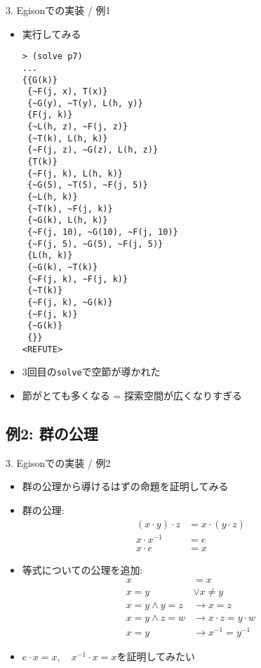 \documentclass[dvipdfmx,11pt,notheorems]{beamer}
\theoremstyle{definition}
\newcommand{\code}[1]{\texttt{#1}}
\begin{document}
\begin{frame}[fragile]{3. Egisonでの実装 / 例1}
  \begin{itemize}
    \item 実行してみる
    \begin{verbatim}
> (solve p7)
...
{{G(k)}
 {~F(j, x), T(x)}
 {~G(y), ~T(y), L(h, y)}
 {F(j, k)}
 {~L(h, z), ~F(j, z)}
 {~T(k), L(h, k)}
 {~F(j, z), ~G(z), L(h, z)}
 {T(k)}
 {~F(j, k), L(h, k)}
 {~G(5), ~T(5), ~F(j, 5)}
 {~L(h, k)}
 {~T(k), ~F(j, k)}
 {~G(k), L(h, k)}
 {~F(j, 10), ~G(10), ~F(j, 10)}
 {~F(j, 5), ~G(5), ~F(j, 5)}
 {L(h, k)}
 {~G(k), ~T(k)}
 {~F(j, k), ~F(j, k)}
 {~T(k)}
 {~F(j, k), ~G(k)}
 {~F(j, k)}
 {~G(k)}
 {}}
<REFUTE>
    \end{verbatim}
    \item 3回目の\code{solve}で空節が導かれた
    \item 節がとても多くなる = 探索空間が広くなりすぎる
  \end{itemize}
\end{frame}

\subsection{例2: 群の公理}
\begin{frame}[fragile]{3. Egisonでの実装 / 例2}
  \begin{itemize}
    \item 群の公理から導けるはずの命題を証明してみる
    \item 群の公理:
    \vspace{-10pt}
    \begin{align*}
      (x \cdot y) \cdot z &= x \cdot (y \cdot z) \\
      x \cdot x^{-1} &= e \\
      x \cdot e &= x
    \end{align*}
    \item 等式についての公理を追加:
    \vspace{-10pt}
    \begin{align*}
      x &= x \\
      x = y &\lor x \neq y \\
      x = y \land y = z &\rightarrow x = z \\
      x = y \land z = w &\rightarrow x \cdot z = y \cdot w \\
      x = y &\rightarrow x^{-1} = y^{-1}
    \end{align*}
    \item $e \cdot x = x, \quad x^{-1} \cdot x = x$を証明してみたい
  \end{itemize}
\end{frame}
\end{document}
